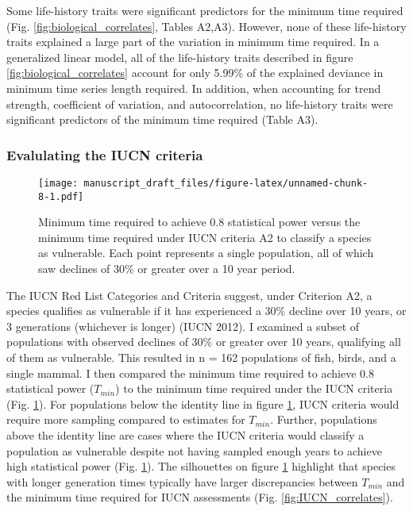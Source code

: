 \documentclass[12pt,]{article}
\begin{document}
\begin{spacing}{2}
Some life-history traits were significant predictors for the minimum
time required (Fig. \ref{fig:biological_correlates}, Tables A2,A3).
However, none of these life-history traits explained a large part of the
variation in minimum time required. In a generalized linear model, all
of the life-history traits described in figure
\ref{fig:biological_correlates} account for only 5.99\% of the explained
deviance in minimum time series length required. In addition, when
accounting for trend strength, coefficient of variation, and
autocorrelation, no life-history traits were significant predictors of
the minimum time required (Table A3).

\subsubsection{Evalulating the IUCN
criteria}\label{evalulating-the-iucn-criteria}

\begin{figure}[htbp]
\centering
\texttt{[image: manuscript\_draft\_files/figure-latex/unnamed-chunk-8-1.pdf]}
\caption{Minimum time required to achieve 0.8 statistical power versus
the minimum time required under IUCN criteria A2 to classify a species
as vulnerable. Each point represents a single population, all of which
saw declines of 30\% or greater over a 10 year
period.\label{fig:IUCN_analysis}}
\end{figure}

The IUCN Red List Categories and Criteria suggest, under Criterion A2, a
species qualifies as vulnerable if it has experienced a 30\% decline
over 10 years, or 3 generations (whichever is longer) (IUCN 2012). I
examined a subset of populations with observed declines of 30\% or
greater over 10 years, qualifying all of them as vulnerable. This
resulted in n = 162 populations of fish, birds, and a single mammal. I
then compared the minimum time required to achieve 0.8 statistical power
(\(T_{min}\)) to the minimum time required under the IUCN criteria (Fig.
\ref{fig:IUCN_analysis}). For populations below the identity line in
figure \ref{fig:IUCN_analysis}, IUCN criteria would require more
sampling compared to estimates for \(T_{min}\). Further, populations
above the identity line are cases where the IUCN criteria would classify
a population as vulnerable despite not having sampled enough years to
achieve high statistical power (Fig. \ref{fig:IUCN_analysis}). The
silhouettes on figure \ref{fig:IUCN_analysis} highlight that species
with longer generation times typically have larger discrepancies between
\(T_{min}\) and the minimum time required for IUCN assessments (Fig.
\ref{fig:IUCN_correlates}).


\end{spacing}
\end{document}
